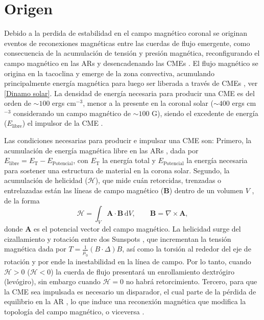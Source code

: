 \section{Origen}
\label{origen}
Debido a la perdida de estabilidad en el campo magnético coronal se originan eventos de reconexiones magnéticas entre las cuerdas de flujo emergente, como consecuencia de la acumulación de tensión y presión magnética, reconfigurando el campo magnético en las \acp{AR}  y desencadenando las \acp{CME} \parencite[e.g.,][]{low-1996, chen-2011}. El flujo magnético se origina en la tacoclina y emerge de la zona convectiva, acumulando principalmente energía magnética para luego ser liberada a través de \acp{CME} \parencite[e.g.,][]{chen-2000}, ver \autoref{Dinamo solar}. La densidad de energía necesaria para producir una \ac{CME} es del orden de $\sim100$ ergs cm$^{-3}$, menor a la presente en la coronal solar ($\sim400$ ergs cm$^{-3}$ considerando un campo magnético de $\sim100$ G), siendo el excedente de energía ($E_{\text{libre}}$) el impulsor de la CME \parencite[e.g.,][]{forbes-2000}.

Las condiciones necesarias para producir e impulsar una \ac{CME} son: Primero, la acumulación de energía magnética libre en las \acp{AR} \parencite[e.g.,][]{sun-2012}, dada por $E_{\text{libre}}=E_{\text{T}}-E_{\text{Potencial}}$, con $E_{\text{T}}$ la energía total y $E_{\text{Potencial}}$ la energía necesaria para sostener una estructura de material en la corona solar. Segundo, la acumulación de helicidad ($\mathcal{H}$), que mide cuán retorcidas, trenzadas o entrelazadas están las líneas de campo magnético ($\mathbf{B}$) dentro de un volumen $V$ \parencite[e.g.,][]{vemareddy-2012}, de la forma
\begin{equation*}
    \mathcal{H} = \int_V \mathbf{A}\cdot \mathbf{B}\,\mathrm{d}V,
\qquad
\mathbf{B} = \nabla \times \mathbf{A},
\end{equation*}
donde $\mathbf{A}$ es el potencial vector del campo magnético. La helicidad surge del cizallamiento y rotación entre dos \ac{Sunspots} \parencite[e.g.,][]{zhang-2007a, brown-2003}, que incrementan la tensión magnética dada por $T=\frac{1}{\mu_{0}}(B\cdot \Delta)B$, así como la torsión al rededor del eje de rotación y por ende la inestabilidad en la línea de campo. Por lo tanto, cuando $\mathcal{H}>0$ ($\mathcal{H}<0$) la cuerda de flujo presentará un enrollamiento dextrógiro (levógiro), sin embargo cuando $\mathcal{H}=0$ no habrá retorcimiento. Tercero, para que la CME sea impulsada es necesario un disparador, el cual parte de la pérdida de equilibrio en la \ac{AR} \parencite[e.g.,][]{fan-2007}, lo que induce una reconexión magnética que modifica la topología del campo magnético, o viceversa \parencite[e.g.,][]{moore-2001}.

